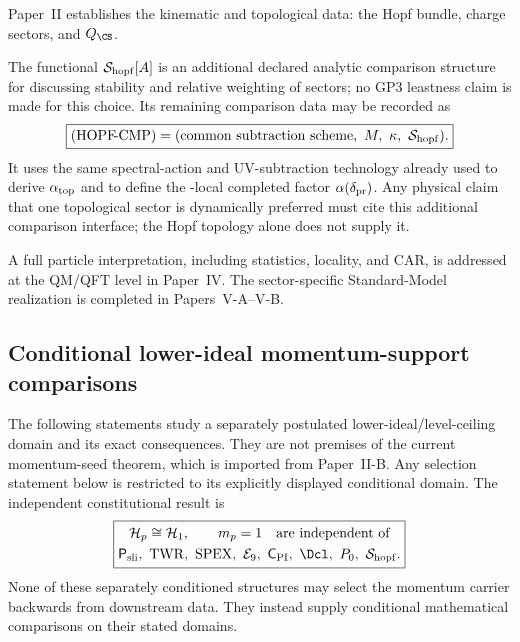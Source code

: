 \documentclass[11pt,a4paper]{article}
\begin{document}
\begin{remark}
\leavevmode\par\noindent
Paper~II establishes the kinematic and topological data: the Hopf bundle,
charge sectors, and \(Q_{\CS}\).

The functional \(\mathcal S_{\rm hopf}[A]\) is an additional declared analytic comparison structure for discussing stability and relative weighting of sectors; no GP3 leastness claim is made for this choice.  Its remaining comparison data may be recorded as
\[
 \boxed{
 (\mathrm{HOPF\!\text{-}CMP})
 =(
 \text{common subtraction scheme},\ M,\ \kappa,\
 \mathcal S_{\rm hopf}
 ).}
\]
It uses the same spectral-action and UV-subtraction technology already used
to derive \(\alpha_{\rm top}\) and to define the \Dcl-local completed factor
\(\alpha(\delta_{\rm pr})\).  Any physical claim that one topological sector
is dynamically preferred must cite this additional comparison interface;
the Hopf topology alone does not supply it.

A full particle interpretation, including statistics, locality, and CAR, is
addressed at the QM/QFT level in Paper~IV.  The sector-specific Standard-Model
realization is completed in Papers~V-A--V-B.
\end{remark}

\subsection{Conditional lower-ideal momentum-support comparisons}
\label{p3b:app:legacy-selector}
The following statements study a separately postulated lower-ideal/level-ceiling
domain and its exact consequences. They are not
premises of the current momentum-seed theorem, which is imported from
Paper~II-B. Any selection statement below is restricted
to its explicitly displayed conditional
domain. The independent constitutional result is
\[
 \boxed{\begin{gathered}
 \mathcal H_p\cong\mathcal H_1,\qquad m_p=1
 \quad\text{are independent of}\\
 \mathsf P_{\rm sli},\ \mathrm{TWR},\ \mathrm{SPEX},\ \mathcal E_9,\
 \mathsf C_{\rm PI},\ \Dcl,\ P_0,\ \mathcal S_{\rm hopf}.
 \end{gathered}}
\]
None of these separately conditioned structures may select the momentum
carrier backwards from downstream data. They instead supply
conditional mathematical comparisons on their stated domains.
\end{document}
